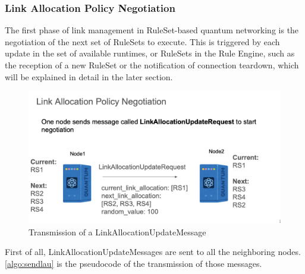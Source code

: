 \subsubsection{Link Allocation Policy Negotiation}
The first phase of link management in RuleSet-based quantum networking is the negotiation of the next set of RuleSets to execute.
This is triggered by each update in the set of available runtimes, or RuleSets in the Rule Engine, such as the reception of a new RuleSet or the notification of connection teardown, which will be explained in detail in the later section.
\begin{figure}[H]
  \centerline{\includegraphics[width=.8\columnwidth]{images/link_allocation_update_message.png}}
  \caption{Transmission of a LinkAllocationUpdateMessage}
\end{figure}

First of all, LinkAllocationUpdateMessages are sent to all the neighboring nodes. \ref{algo:sendlau} is the pseudocode of the transmission of those messages.

